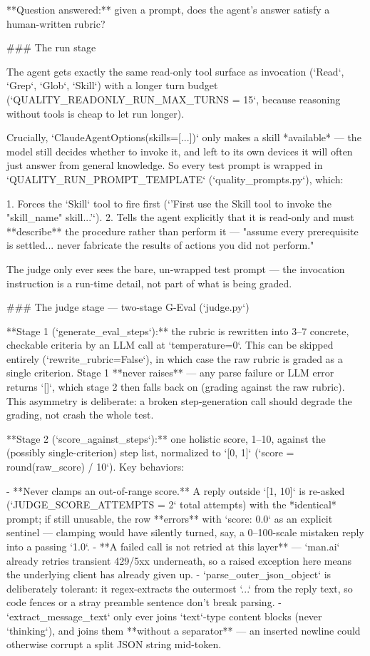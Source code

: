 **Question answered:** given a prompt, does the agent's answer satisfy a human-written rubric?

### The run stage

The agent gets exactly the same read-only tool surface as invocation (`Read`, `Grep`, `Glob`, `Skill`) with a longer turn budget (`QUALITY_READONLY_RUN_MAX_TURNS = 15`, because reasoning without tools is cheap to let run longer).

Crucially, `ClaudeAgentOptions(skills=[...])` only makes a skill *available* — the model still decides whether to invoke it, and left to its own devices it will often just answer from general knowledge. So every test prompt is wrapped in `QUALITY_RUN_PROMPT_TEMPLATE` (`quality_prompts.py`), which:

1. Forces the `Skill` tool to fire first (`'First use the Skill tool to invoke the "{skill_name}" skill...'`).
2. Tells the agent explicitly that it is read-only and must **describe** the procedure rather than perform it — "assume every prerequisite is settled... never fabricate the results of actions you did not perform."

The judge only ever sees the bare, un-wrapped test prompt — the invocation instruction is a run-time detail, not part of what is being graded.

### The judge stage — two-stage G-Eval (`judge.py`)

**Stage 1 (`generate_eval_steps`):** the rubric is rewritten into 3–7 concrete, checkable criteria by an LLM call at `temperature=0`. This can be skipped entirely (`rewrite_rubric=False`), in which case the raw rubric is graded as a single criterion. Stage 1 **never raises** — any parse failure or LLM error returns `[]`, which stage 2 then falls back on (grading against the raw rubric). This asymmetry is deliberate: a broken step-generation call should degrade the grading, not crash the whole test.

**Stage 2 (`score_against_steps`):** one holistic score, 1–10, against the (possibly single-criterion) step list, normalized to `[0, 1]` (`score = round(raw_score) / 10`). Key behaviors:

- **Never clamps an out-of-range score.** A reply outside `[1, 10]` is re-asked (`JUDGE_SCORE_ATTEMPTS = 2` total attempts) with the *identical* prompt; if still unusable, the row **errors** with `score: 0.0` as an explicit sentinel — clamping would have silently turned, say, a 0–100-scale mistaken reply into a passing `1.0`.
- **A failed call is not retried at this layer** — `man.ai` already retries transient 429/5xx underneath, so a raised exception here means the underlying client has already given up.
- `parse_outer_json_object` is deliberately tolerant: it regex-extracts the outermost `{...}` from the reply text, so code fences or a stray preamble sentence don't break parsing.
- `extract_message_text` only ever joins `text`-type content blocks (never `thinking`), and joins them **without a separator** — an inserted newline could otherwise corrupt a split JSON string mid-token.


